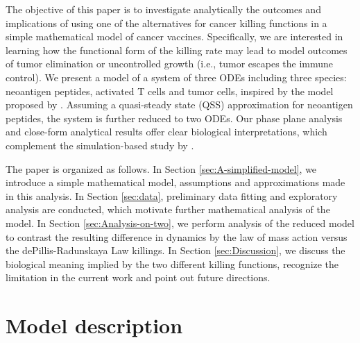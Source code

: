 \documentclass[review,authoryear]{elsarticle}
\begin{document}
The objective of this paper is to investigate analytically the outcomes
and implications of using one of the alternatives for cancer killing functions in a simple mathematical
model of cancer vaccines. Specifically, we are interested in learning
how the functional form of the killing rate may lead to model outcomes of tumor elimination
or uncontrolled growth (i.e., tumor escapes the immune control). We present
a model of a system of three ODEs
including three species: neoantigen peptides, activated T cells and tumor
cells, inspired by the model proposed by \citet{Messan2021}. Assuming a quasi-steady state (QSS) approximation for neoantigen peptides, the system is further reduced
to two ODEs. Our phase plane analysis and close-form analytical
results offer clear biological interpretations, which complement
the simulation-based study by \citet{Messan2021}. 

The paper is organized as follows. In Section \ref{sec:A-simplified-model},
we introduce a simple mathematical model, assumptions and approximations made in this analysis. In Section \ref{sec:data}, preliminary data fitting and exploratory analysis are conducted, which motivate further mathematical analysis of the model. In Section \ref{sec:Analysis-on-two},
we perform analysis of the reduced model to contrast the resulting
difference in dynamics by the law of mass action versus the dePillis-Radunskaya
Law killings. In Section \ref{sec:Discussion}, we discuss the biological
meaning implied by the two different killing functions, recognize the
limitation in the current work and point out future directions. 



\section{Model description \label{sec:A-simplified-model}}
\end{document}

